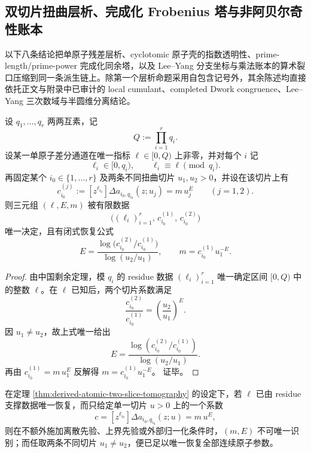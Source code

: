 \subsection{双切片扭曲层析、完成化 Frobenius 塔与非阿贝尔奇性账本}

以下八条结论把单原子残差层析、cyclotomic 原子壳的指数透明性、prime-length/prime-power 完成化同余塔，以及 Lee--Yang 分支坐标与乘法账本的算术裂口压缩到同一条派生链上。除第一个层析命题采用自包含记号外，其余陈述均直接依托正文与附录中已审计的 local cumulant、completed Dwork congruence、Lee--Yang 三次数域与半圆维分离结论。

\begin{theorem}[单原子残差的双扭曲切片刚性层析]\label{thm:derived-atomic-two-slice-tomography}
设 \(q_1,\dots,q_r\) 两两互素，记
\[
Q:=\prod_{i=1}^{r}q_i.
\]
设某一单原子差分通道在唯一指标 \(\ell\in [0,Q)\) 上非零，并对每个 \(i\) 记
\[
\ell_i\in [0,q_i),\qquad \ell_i\equiv \ell \pmod{q_i}.
\]
再固定某个 \(i_0\in\{1,\dots,r\}\) 及两条不同扭曲切片 \(u_1,u_2>0\)，并设在该切片上有
\[
c_{i_0}^{(j)}
:=
[z^{\ell_{i_0}}]\Delta a_{i_0,q_{i_0}}(z;u_j)
=
m\,u_j^{E}
\qquad (j=1,2).
\]
则三元组 \((\ell,E,m)\) 被有限数据
\[
\bigl((\ell_i)_{i=1}^{r},\,c_{i_0}^{(1)},\,c_{i_0}^{(2)}\bigr)
\]
唯一决定，且有闭式恢复公式
\[
E=\frac{\log\!\bigl(c_{i_0}^{(2)}/c_{i_0}^{(1)}\bigr)}{\log(u_2/u_1)},
\qquad
m=c_{i_0}^{(1)}u_1^{-E}.
\]
\end{theorem}

\begin{proof}
由中国剩余定理，模 \(q_i\) 的 residue 数据 \((\ell_i)_{i=1}^{r}\) 唯一确定区间 \([0,Q)\) 中的整数 \(\ell\)。在 \(\ell\) 已知后，两个切片系数满足
\[
\frac{c_{i_0}^{(2)}}{c_{i_0}^{(1)}}
=
\left(\frac{u_2}{u_1}\right)^E.
\]
因 \(u_1\neq u_2\)，故上式唯一给出
\[
E=\frac{\log(c_{i_0}^{(2)}/c_{i_0}^{(1)})}{\log(u_2/u_1)}.
\]
再由
\(
c_{i_0}^{(1)}=m\,u_1^E
\)
反解得
\(
m=c_{i_0}^{(1)}u_1^{-E}
\)。
证毕。
\end{proof}

\begin{corollary}\label{cor:derived-atomic-one-vs-two-slice-identifiability}
在定理 \ref{thm:derived-atomic-two-slice-tomography} 的设定下，若 \(\ell\) 已由 residue 支撑数据唯一恢复，而只给定单一切片 \(u>0\) 上的一个系数
\[
c=[z^{\ell_{i_0}}]\Delta a_{i_0,q_{i_0}}(z;u)=m\,u^E,
\]
则在不额外施加离散先验、上界先验或外部归一化条件时，\((m,E)\) 不可唯一识别；而任取两条不同切片 \(u_1\neq u_2\)，便已足以唯一恢复全部连续原子参数。
\end{corollary}

